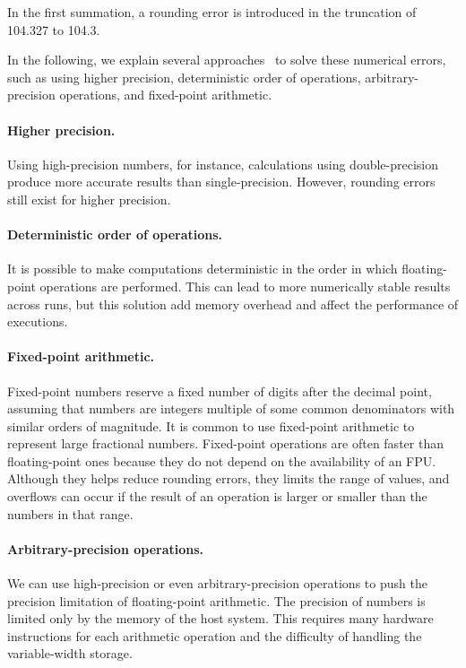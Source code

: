 In the first summation, a rounding error is introduced in the truncation of 104.327 to 104.3.

In the following, we explain several approaches~\cite{muller2018reproducible}
to solve these numerical errors, such as using higher precision, deterministic order of operations,
arbitrary-precision operations, and fixed-point arithmetic.

\paragraph{Higher precision.} Using high-precision numbers, for instance,
calculations using double-precision produce more accurate results than single-precision.
However, rounding errors still exist for higher precision.

\paragraph{Deterministic order of operations.} It is possible to make computations deterministic
in the order in which floating-point operations are performed.
This can lead to more numerically stable results across runs,
but this solution add memory overhead and affect the performance of executions\cite{balkesen2014memory}. %

\paragraph{Fixed-point arithmetic.} %
Fixed-point numbers reserve a fixed number of digits after the decimal point,
assuming that numbers are integers multiple of some common denominators with similar orders of magnitude. 
It is common to use fixed-point arithmetic to represent large fractional numbers. 
Fixed-point operations are often faster than floating-point ones because they do not
depend on the availability of an FPU.
Although they helps reduce rounding errors, they limits the range of values, and overflows can occur
if the result of an operation is larger or smaller than the numbers in that range.

\paragraph{Arbitrary-precision operations.} We can use high-precision or even arbitrary-precision
operations to push the precision limitation of floating-point arithmetic. 
The precision of numbers is limited only by the memory of the host system. 
This requires many hardware instructions for each arithmetic operation and
the difficulty of handling the variable-width storage.


